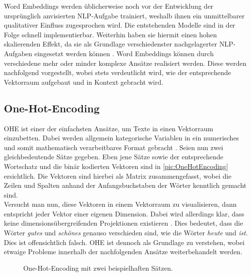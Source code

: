 \noindent
Word Embeddings werden üblicherweise noch vor der Entwicklung der ursprünglich anvisierten \ac{NLP}-Aufgabe trainiert, weshalb ihnen ein unmittelbarer qualitativer Einfluss zugesprochen wird. Die entstehenden Modelle sind in der Folge schnell implementierbar. Weiterhin haben sie hiermit einen hohen skalierenden Effekt, da sie als Grundlage verschiedenster nachgelagerter \ac{NLP}-Aufgaben eingesetzt werden können \cite{NIT19}. Word Embeddings können durch verschiedene mehr oder minder komplexe Ansätze realisiert werden. Diese werden nachfolgend vorgestellt, wobei stets verdeutlicht wird, wie der entsprechende Vektorraum aufgebaut und in Kontext gebracht wird.


\subsection{One-Hot-Encoding}
\noindent
\ac{OHE} ist einer der einfachsten Ansätze, um Texte in einen Vektorraum einzubetten. Dabei werden allgemein kategorische Variablen in ein numerisches und somit mathematisch verarbeitbares Format gebracht \cite{KAR18}. Seien nun zwei gleichbedeutende Sätze gegeben. Eben jene Sätze sowie der entsprechende Wortschatz und die binär kodierten Vektoren sind in \autoref{pic:OneHotEncoding} ersichtlich. Die Vektoren sind hierbei als Matrix zusammengefasst, wobei die Zeilen und Spalten anhand der Anfangsbuchstaben der Wörter kenntlich gemacht sind.\\

\noindent
Versucht man nun, diese Vektoren in einem Vektorraum zu visualisieren, dann entspricht jeder Vektor einer eigenen Dimension. Dabei wird allerdings klar, dass keine dimensionsübergreifenden Projektionen existieren \cite{KAR18}. Dies bedeutet, dass die Wörter \textit{gutes} und \textit{schönes} genauso verschieden sind, wie die Wörter \textit{heute} und \textit{ist}. Dies ist offensichtlich falsch. \ac{OHE} ist dennoch als Grundlage zu verstehen, wobei etwaige Probleme innerhalb der nachfolgenden Ansätze weiterbehandelt werden.

\begin{figure}[h!]
  \centering
  \caption{One-Hot-Encoding mit zwei beispielhaften Sätzen.}
  \label{pic:OneHotEncoding}
\end{figure}


